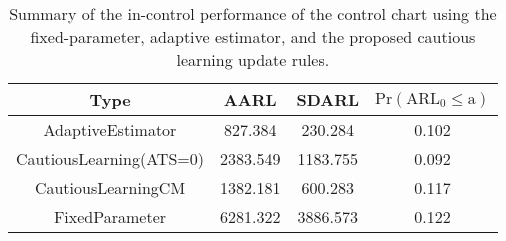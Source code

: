 \begin{table}[!h]

\caption{Summary of the in-control performance of the control chart using the fixed-parameter, adaptive estimator, and the proposed cautious learning update rules.}
\centering
\begin{tabular}[t]{cccc}
\toprule
Type & AARL & SDARL & $\text{Pr}(\text{ARL}_0 \leq \text{a})$\\
\midrule
AdaptiveEstimator & 827.384 & 230.284 & 0.102\\
CautiousLearning(ATS=0) & 2383.549 & 1183.755 & 0.092\\
CautiousLearningCM & 1382.181 & 600.283 & 0.117\\
FixedParameter & 6281.322 & 3886.573 & 0.122\\
\bottomrule
\end{tabular}
\end{table}

